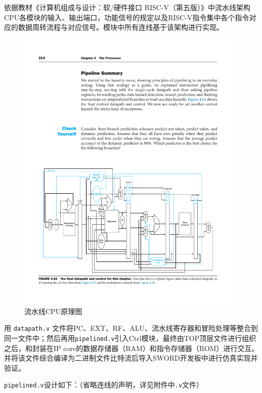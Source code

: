 \documentclass[UTF8,a4paper,autofakebold,15pt]{ctexart}
\begin{document}
依据教材《计算机组成与设计：软/硬件接口 RISC-V（第五版）》\cite{ref1}中流水线架构CPU各模块的输入、输出端口，功能信号的规定以及RISC-V指令集中各个指令对应的数据周转流程与对应信号。模块中所有连线基于该架构进行实现。

\begin{figure}[ht]
	\centering
	\includegraphics{fig7.pdf}
	\caption{流水线CPU原理图\cite{ref1}}
	\label{fig:label7}
\end{figure}

用 {\tt datapath.v} 文件将PC、EXT、RF、ALU、流水线寄存器和冒险处理等整合到同一文件中；然后再用{\tt pipelined.v}引入Ctrl模块，最终由TOP顶层文件进行组织之后，和封装在IP core的数据存储器（RAM）和指令存储器（ROM）进行交互。并将该文件综合编译为二进制文件比特流后导入SWORD开发板中进行仿真实现并验证。

{\tt pipelined.v}设计如下：（省略连线的声明，详见附件中{\tt .v}文件）
\end{document}
